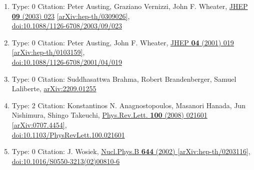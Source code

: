 \documentclass[a4paper,10pt]{article}
\begin{document}
\begin{enumerate}
\begin{enumerate}
  \item Type: 0 Citation: Peter Austing, Graziano Vernizzi, John F. Wheater, \href{https://www.doi.org/10.1088/1126-6708/2003/09/023}{JHEP {\bf 09} (2003) 023}  \href{https://arxiv.org/abs/hep-th/0309026}{[arXiv:hep-th/0309026]},\\\href{https://www.doi.org/10.1088/1126-6708/2003/09/023}{doi:10.1088/1126-6708/2003/09/023}
  \item Type: 0 Citation: Peter Austing, John F. Wheater, \href{https://www.doi.org/10.1088/1126-6708/2001/04/019}{JHEP {\bf 04} (2001) 019}  \href{https://arxiv.org/abs/hep-th/0103159}{[arXiv:hep-th/0103159]},\\\href{https://www.doi.org/10.1088/1126-6708/2001/04/019}{doi:10.1088/1126-6708/2001/04/019}
  \item Type: 0 Citation: Suddhasattwa Brahma, Robert Brandenberger, Samuel Laliberte, \href{https://arxiv.org/abs/2209.01255}{arXiv:2209.01255}
  \item Type: 2 Citation: Konstantinos N. Anagnostopoulos, Masanori Hanada, Jun Nishimura, Shingo Takeuchi, \href{https://www.doi.org/10.1103/PhysRevLett.100.021601}{Phys.Rev.Lett. {\bf 100} (2008) 021601}  \href{https://arxiv.org/abs/0707.4454}{[arXiv:0707.4454]},\\\href{https://www.doi.org/10.1103/PhysRevLett.100.021601}{doi:10.1103/PhysRevLett.100.021601}
  \item Type: 0 Citation: J. Wosiek, \href{https://www.doi.org/10.1016/S0550-3213(02)00810-6}{Nucl.Phys.B {\bf 644} (2002) }  \href{https://arxiv.org/abs/hep-th/0203116}{[arXiv:hep-th/0203116]},\\\href{https://www.doi.org/10.1016/S0550-3213(02)00810-6}{doi:10.1016/S0550-3213(02)00810-6}

\end{enumerate}
\end{enumerate}
\end{document}
